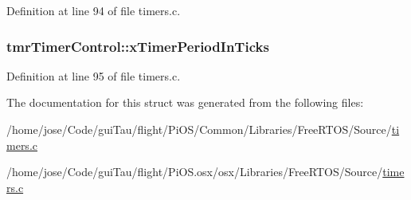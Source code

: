 Definition at line 94 of file timers.\-c.

\hypertarget{structtmr_timer_control_a4a4c230e30165b29ec13a0ef8c76882e}{
\subsubsection[{x\-Timer\-Period\-In\-Ticks}]{ tmr\-Timer\-Control\-::x\-Timer\-Period\-In\-Ticks}}\label{structtmr_timer_control_a4a4c230e30165b29ec13a0ef8c76882e}


Definition at line 95 of file timers.\-c.



The documentation for this struct was generated from the following files\-:\begin{DoxyCompactItemize}
\item 
/home/jose/\-Code/gui\-Tau/flight/\-Pi\-O\-S/\-Common/\-Libraries/\-Free\-R\-T\-O\-S/\-Source/\hyperlink{_common_2_libraries_2_free_r_t_o_s_2_source_2timers_8c}{timers.\-c}\item 
/home/jose/\-Code/gui\-Tau/flight/\-Pi\-O\-S.\-osx/osx/\-Libraries/\-Free\-R\-T\-O\-S/\-Source/\hyperlink{osx_2osx_2_libraries_2_free_r_t_o_s_2_source_2timers_8c}{timers.\-c}\end{DoxyCompactItemize}
